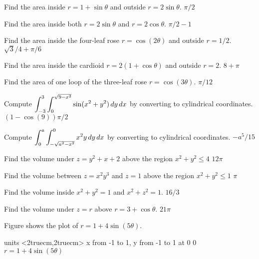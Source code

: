 \exercise Find the area inside $r=1+\sin\theta$ and outside
$r=2\sin\theta$. 
\answer $\pi/2$
\endanswer
\endexercise

\exercise Find the area inside both
$r=2\sin\theta$ and $r=2\cos\theta$. 
\answer $\pi/2-1$
\endanswer
\endexercise

\exercise Find the area inside the four-leaf rose $r=\cos(2\theta)$
and outside $r=1/2$.
\answer $\sqrt3/4+\pi/6$
\endanswer

\endexercise

\exercise Find the area inside the cardioid $r=2(1+\cos\theta)$
and outside $r=2$.
\answer $8+\pi$
\endanswer

\endexercise

\exercise  \relax{}
Find the area of one loop of the three-leaf rose
 $r=\cos(3\theta)$.
\answer $\pi/12$\
\endanswer
\endexercise

\exercise Compute $\displaystyle \int_{-3}^3\int_0^{\sqrt{9-x^2}}
\sin(x^2+y^2)\,dy\,dx$ by converting to cylindrical coordinates.
\answer $(1-\cos(9))\pi/2$
\endanswer
\endexercise

\exercise Compute $\displaystyle \int_{0}^a\int_{-\sqrt{a^2-x^2}}^0 x^2y\,dy\,dx$ 
by converting to cylindrical coordinates.
\answer $-a^5/15$
\endanswer


\endexercise

\exercise Find the volume under $z=y^2+x+2$ above
the region $x^2+y^2\le 4$
\answer $12\pi$
\endanswer
\endexercise

\exercise Find the volume between
$z=x^2y^3$ and $z=1$ above
the region $x^2+y^2\le 1$
\answer $\pi$
\endanswer
\endexercise

\exercise Find the volume inside
$x^2+y^2=1$ and $x^2+z^2=1$.
\answer $16/3$
\endanswer

\endexercise

\exercise Find the volume under $z=r$ above $r=3+\cos\theta$.
\answer $21\pi$
\endanswer
\endexercise

\exercise Figure  shows the plot of
$r=1+4\sin(5\theta)$.

\figure
\texonly
\vbox{\beginpicture
\normalgraphs
\ninepoint
\setcoordinatesystem units <2truecm,2truecm>
\setplotarea x from -1 to 1, y from -1 to 1
 at 0 0
\endpicture}
\endtexonly
{}
\begincaption
$r=1+4\sin(5\theta)$
\endcaption
\endfigure

